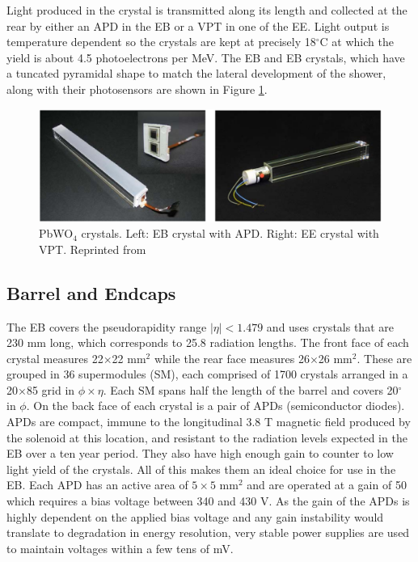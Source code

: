 Light produced in the crystal is transmitted along its length and collected at the rear by either an APD in the EB or a VPT in one of the EE.  Light output is temperature dependent so the crystals are kept at precisely 18$^{\circ}$C at which the yield is about 4.5 photoelectrons per MeV.  The EB and EB crystals, which have a tuncated pyramidal shape to match the lateral development of the shower, along with their photosensors are shown in Figure \ref{fig:ecalcrystals}.  

\begin{figure}[h]
	\centering
	\includegraphics[width=1.0\linewidth]{Figures/ECAL_crystals}
	\caption{PbWO$_{4}$ crystals. Left: EB crystal with APD. Right: EE crystal with VPT.  Reprinted from \cite{Collaboration_2008}}
	\label{fig:ecalcrystals}
\end{figure}


\subsection{Barrel and Endcaps}
The EB covers the pseudorapidity range $|\eta|<1.479$ and uses crystals that are 230 mm long, which corresponds to 25.8 radiation lengths.  The front face of each crystal measures 22$\times$22 mm$^{2}$ while the rear face measures 26$\times$26 mm$^{2}$.  These are grouped in 36 supermodules (SM), each comprised of 1700 crystals arranged in a 20$\times$85 grid in $\phi \times \eta$.  Each SM spans half the length of the barrel and covers 20$^{\circ}$ in $\phi$.  On the back face of each crystal is a pair of APDs (semiconductor diodes).  APDs are compact, immune to the longitudinal 3.8 T magnetic field produced by the solenoid at this location, and resistant to the radiation levels expected in the EB over a ten year period.  They also have high enough gain to counter to low light yield of the crystals.  All of this makes them an ideal choice for use in the EB.  Each APD has an active area of $5 \times 5$ mm$^{2}$ and are operated at a gain of 50 which requires a bias voltage between 340 and 430 V.  As the gain of the APDs is highly dependent on the applied bias voltage and any gain instability would translate to degradation in energy resolution, very stable power supplies are used to maintain voltages within a few tens of mV.

